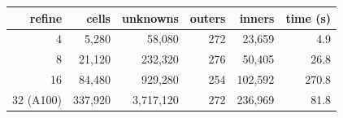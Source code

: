 \begin{tabular}{rrrrrr}
\hline
refine & cells & unknowns & outers & inners & time (s)\\
\hline
4 & 5,280 & 58,080 & 272 & 23,659 & 4.9\\
8 & 21,120 & 232,320 & 276 & 50,405 & 26.8\\
16 & 84,480 & 929,280 & 254 & 102,592 & 270.8\\
32 (A100) & 337,920 & 3,717,120 & 272 & 236,969 & 81.8\\
\hline
\end{tabular}
